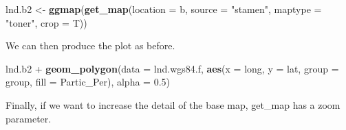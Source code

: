 \documentclass[]{article}
\newenvironment{Shaded}{}{}
\newcommand{\KeywordTok}[1]{\textcolor[rgb]{0.00,0.44,0.13}{\textbf{{#1}}}}
\newcommand{\DataTypeTok}[1]{\textcolor[rgb]{0.56,0.13,0.00}{{#1}}}
\newcommand{\FloatTok}[1]{\textcolor[rgb]{0.25,0.63,0.44}{{#1}}}
\newcommand{\StringTok}[1]{\textcolor[rgb]{0.25,0.44,0.63}{{#1}}}
\newcommand{\NormalTok}[1]{{#1}}
\begin{document}
\begin{Shaded}
\begin{Highlighting}[]
\NormalTok{lnd.b2 <- }\KeywordTok{ggmap}\NormalTok{(}\KeywordTok{get_map}\NormalTok{(}\DataTypeTok{location =} \NormalTok{b, }\DataTypeTok{source =} \StringTok{"stamen"}\NormalTok{, }\DataTypeTok{maptype =} \StringTok{"toner"}\NormalTok{, }
    \DataTypeTok{crop =} \NormalTok{T))}
\end{Highlighting}
\end{Shaded}
We can then produce the plot as before.

\begin{Shaded}
\begin{Highlighting}[]
\NormalTok{lnd.b2 + }\KeywordTok{geom_polygon}\NormalTok{(}\DataTypeTok{data =} \NormalTok{lnd.wgs84.f, }\KeywordTok{aes}\NormalTok{(}\DataTypeTok{x =} \NormalTok{long, }\DataTypeTok{y =} \NormalTok{lat, }\DataTypeTok{group =} \NormalTok{group, }
    \DataTypeTok{fill =} \NormalTok{Partic_Per), }\DataTypeTok{alpha =} \FloatTok{0.5}\NormalTok{)}
\end{Highlighting}
\end{Shaded}
Finally, if we want to increase the detail of the base map, get\_map has
a zoom parameter.
\end{document}
